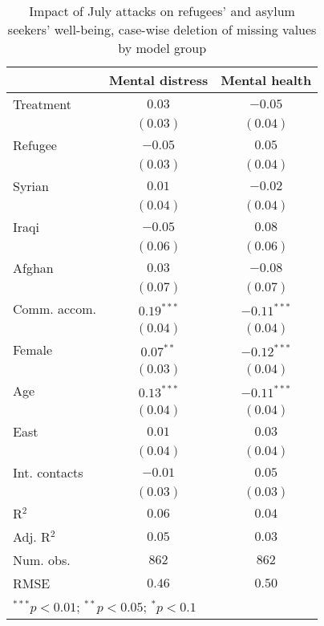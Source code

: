 
\begin{table}
\caption{Impact of July attacks on refugees' and asylum seekers' well-being, case-wise deletion of missing values by model group}
\begin{center}
\begin{tabular}{l c c}
\toprule
 & Mental distress & Mental health \\
\midrule
Treatment     & $0.03$       & $-0.05$       \\
              & $(0.03)$     & $(0.04)$      \\
Refugee       & $-0.05$      & $0.05$        \\
              & $(0.03)$     & $(0.04)$      \\
Syrian        & $0.01$       & $-0.02$       \\
              & $(0.04)$     & $(0.04)$      \\
Iraqi         & $-0.05$      & $0.08$        \\
              & $(0.06)$     & $(0.06)$      \\
Afghan        & $0.03$       & $-0.08$       \\
              & $(0.07)$     & $(0.07)$      \\
Comm. accom.  & $0.19^{***}$ & $-0.11^{***}$ \\
              & $(0.04)$     & $(0.04)$      \\
Female        & $0.07^{**}$  & $-0.12^{***}$ \\
              & $(0.03)$     & $(0.04)$      \\
Age           & $0.13^{***}$ & $-0.11^{***}$ \\
              & $(0.04)$     & $(0.04)$      \\
East          & $0.01$       & $0.03$        \\
              & $(0.04)$     & $(0.04)$      \\
Int. contacts & $-0.01$      & $0.05$        \\
              & $(0.03)$     & $(0.03)$      \\
\midrule
R$^2$         & $0.06$       & $0.04$        \\
Adj. R$^2$    & $0.05$       & $0.03$        \\
Num. obs.     & $862$        & $862$         \\
RMSE          & $0.46$       & $0.50$        \\
\bottomrule
\multicolumn{3}{l}{\scriptsize{$^{***}p<0.01$; $^{**}p<0.05$; $^{*}p<0.1$}}
\end{tabular}
\label{tab_mhealth_na_group}
\end{center}
\end{table}
